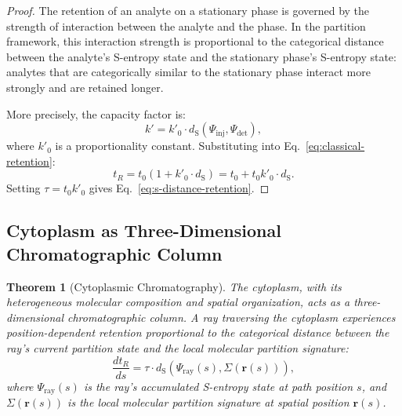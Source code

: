 \documentclass[11pt,twocolumn,a4paper]{article}
\newtheorem{theorem}{Theorem}[section]
\newcommand{\dS}{d_{\mathrm{S}}}
\begin{document}
\begin{proof}
The retention of an analyte on a stationary phase is governed by the
strength of interaction between the analyte and the phase. In the
partition framework, this interaction strength is proportional to the
categorical distance between the analyte's S-entropy state and the
stationary phase's S-entropy state: analytes that are categorically
similar to the stationary phase interact more strongly and are retained
longer.

More precisely, the capacity factor is:
\begin{equation}
k' = k'_0 \cdot \dS(\Psi_{\mathrm{inj}}, \Psi_{\mathrm{det}}),
\end{equation}
where $k'_0$ is a proportionality constant. Substituting into
Eq.~\eqref{eq:classical-retention}:
\begin{equation}
t_R = t_0(1 + k'_0 \cdot \dS) = t_0 + t_0 k'_0 \cdot \dS.
\end{equation}
Setting $\tau = t_0 k'_0$ gives
Eq.~\eqref{eq:s-distance-retention}.
\end{proof}

\subsection{Cytoplasm as Three-Dimensional Chromatographic Column}

\begin{theorem}[Cytoplasmic Chromatography]
\label{thm:cytoplasm-chromatography}
The cytoplasm, with its heterogeneous molecular composition and spatial
organization, acts as a three-dimensional chromatographic column.
A ray traversing the cytoplasm experiences position-dependent retention
proportional to the categorical distance between the ray's current
partition state and the local molecular partition signature:
\begin{equation}
\frac{dt_R}{ds} = \tau \cdot \dS(\Psi_{\mathrm{ray}}(s),
  \Sigma(\mathbf{r}(s))),
\label{eq:cytoplasm-retention}
\end{equation}
where $\Psi_{\mathrm{ray}}(s)$ is the ray's accumulated S-entropy
state at path position $s$, and $\Sigma(\mathbf{r}(s))$ is the local
molecular partition signature at spatial position $\mathbf{r}(s)$.
\end{theorem}
\end{document}
